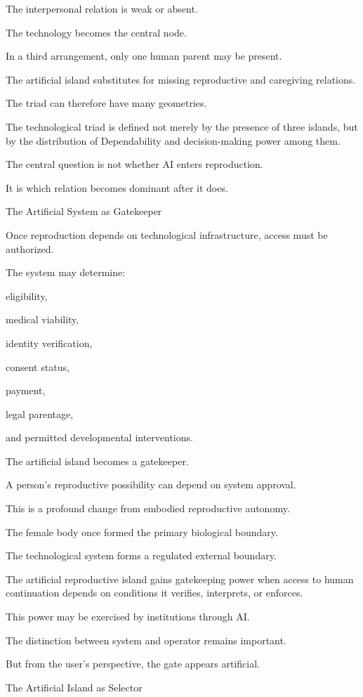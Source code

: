 The interpersonal relation is weak or absent.

The technology becomes the central node.

In a third arrangement, only one human parent may be present.

The artificial island substitutes for missing reproductive and caregiving relations.

The triad can therefore have many geometries.

The technological triad is defined not merely by the presence of three islands, but by the distribution of Dependability and decision-making power among them.

The central question is not whether AI enters reproduction.

It is which relation becomes dominant after it does.

The Artificial System as Gatekeeper

Once reproduction depends on technological infrastructure, access must be authorized.

The system may determine:

eligibility,

medical viability,

identity verification,

consent status,

payment,

legal parentage,

and permitted developmental interventions.

The artificial island becomes a gatekeeper.

A person’s reproductive possibility can depend on system approval.

This is a profound change from embodied reproductive autonomy.

The female body once formed the primary biological boundary.

The technological system forms a regulated external boundary.

The artificial reproductive island gains gatekeeping power when access to human continuation depends on conditions it verifies, interprets, or enforces.

This power may be exercised by institutions through AI.

The distinction between system and operator remains important.

But from the user’s perspective, the gate appears artificial.

The Artificial Island as Selector

